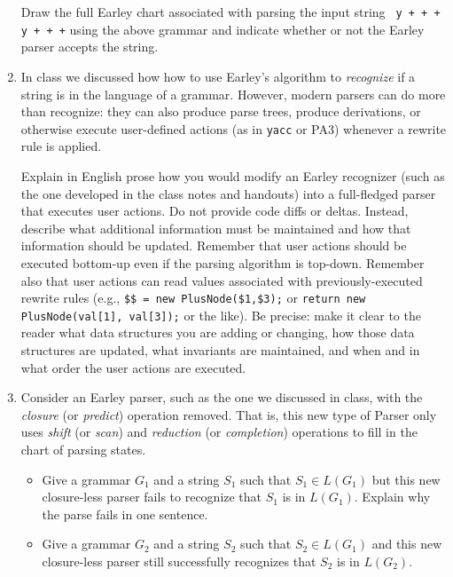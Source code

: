 \documentclass[12pt]{article}
\begin{document}
\begin{enumerate}
Draw the full Earley chart associated with parsing the input string \texttt{ y +
+ + y + + +} using the above grammar and indicate whether or not the Earley
parser accepts the string.

\item

In class we discussed how how to use Earley's algorithm to \emph{recognize}
if a string is in the language of a grammar. However, modern parsers can
do more than recognize: they can also produce parse trees, produce
derivations, or otherwise execute user-defined actions (as in \texttt{yacc} or
PA3) whenever a rewrite rule is applied. 

Explain in English prose how you would modify an Earley recognizer (such as
the one developed in the class notes and handouts) into a full-fledged
parser that executes user actions. Do not provide
code diffs or deltas. Instead, describe what additional information must be
maintained and how that information should be updated. Remember that 
user actions should be executed bottom-up even if the parsing algorithm is
top-down. Remember also that user actions can read values
associated with previously-executed rewrite rules (e.g., \texttt{\$\$ = new
PlusNode(\$1,\$3);} or \texttt{return new PlusNode(val[1], val[3]);} or the
like). 
Be precise: make it clear to the reader what data structures you
are adding or changing, how those data structures are updated, what
invariants are maintained, and when and in what order the user actions are
executed. 

\item

Consider an Earley parser, such as the one we discussed in class, with
the \emph{closure} (or \emph{predict}) operation removed. That is, this
new type of Parser only uses \emph{shift} (or \emph{scan}) and 
\emph{reduction} (or \emph{completion}) operations to fill in the chart of
parsing states. 
  \begin{itemize}
    \item Give a grammar $G_1$ and a string $S_1$ such that $S_1 \in
    L(G_1)$ but this new closure-less parser fails to recognize that $S_1$
    is 
    in $L(G_1)$. Explain why the parse fails in one sentence. 

    \item Give a grammar $G_2$ and a string $S_2$ such that $S_2 \in
    L(G_1)$ and this new closure-less parser still successfully recognizes
    that $S_2$ is in $L(G_2)$. 

  \end{itemize} 






\end{enumerate}
\end{document}
